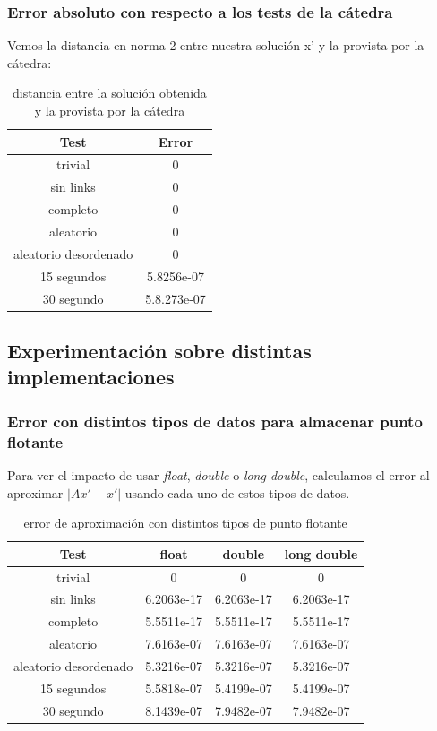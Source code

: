 \subsubsection{Error absoluto con respecto a los tests de la cátedra}
Vemos la distancia en norma 2 entre nuestra solución x' y la provista por la cátedra:

\begin{table}[H]
\centering
\begin{tabular}{ |c|||c| }
 \hline
 Test & Error \\
 \hline
 \hline
 trivial & 0 \\
 sin links & 0 \\
 completo & 0 \\
 aleatorio & 0 \\
 aleatorio desordenado & 0 \\
 15 segundos & 5.8256e-07 \\
 30 segundo & 5.8.273e-07 \\
 \hline
\end{tabular}
\caption{distancia entre la solución obtenida y la provista por la cátedra}
\end{table}



\subsection{Experimentación sobre distintas implementaciones}
\subsubsection{Error con distintos tipos de datos para almacenar punto flotante}
Para ver el impacto de usar \textit{float}, \textit{double} o \textit{long double}, calculamos el error al aproximar $|Ax' - x'|$ usando cada uno de estos tipos de datos.

\begin{table}[H]
\centering
\begin{tabular}{ |c||c|c|c| }
 \hline
 Test & float & double & long double \\
 \hline
 \hline
 trivial & 0 & 0 & 0 \\
 sin links & 6.2063e-17 & 6.2063e-17 & 6.2063e-17 \\
 completo & 5.5511e-17 & 5.5511e-17 & 5.5511e-17 \\
 aleatorio & 7.6163e-07 & 7.6163e-07 & 7.6163e-07 \\
 aleatorio desordenado & 5.3216e-07 & 5.3216e-07 & 5.3216e-07 \\
 15 segundos & 5.5818e-07 & 5.4199e-07 & 5.4199e-07 \\
 30 segundo & 8.1439e-07 & 7.9482e-07 & 7.9482e-07 \\
 \hline
\end{tabular}
\caption{error de aproximación con distintos tipos de punto flotante}
\end{table}

